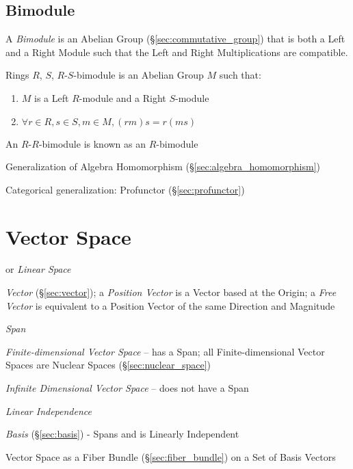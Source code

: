 \subsection{Bimodule}\label{sec:bimodule}

A \emph{Bimodule} is an Abelian Group (\S\ref{sec:commutative_group}) that is
both a Left and a Right Module such that the Left and Right Multiplications are
compatible.

Rings $R$, $S$, $R$-$S$-bimodule is an Abelian Group $M$ such that:

\begin{enumerate}
\item $M$ is a Left $R$-module and a Right $S$-module
\item $\forall r \in R, s \in S, m \in M, (rm)s = r(ms)$
\end{enumerate}

An $R$-$R$-bimodule is known as an $R$-bimodule

Generalization of Algebra Homomorphism
(\S\ref{sec:algebra_homomorphism})

Categorical generalization: Profunctor (\S\ref{sec:profunctor})



\section{Vector Space}\label{sec:vector_space}

or \emph{Linear Space}

\emph{Vector} (\S\ref{sec:vector}); a \emph{Position Vector} is a Vector based
at the Origin; a \emph{Free Vector} is equivalent to a Position Vector of the
same Direction and Magnitude

\emph{Span}

\emph{Finite-dimensional Vector Space} -- has a Span; all
Finite-dimensional Vector Spaces are Nuclear Spaces
(\S\ref{sec:nuclear_space})

\emph{Infinite Dimensional Vector Space} -- does not have a Span

\emph{Linear Independence}

\emph{Basis} (\S\ref{sec:basis}) - Spans and is Linearly Independent

Vector Space as a Fiber Bundle (\S\ref{sec:fiber_bundle}) on a Set of Basis
Vectors

